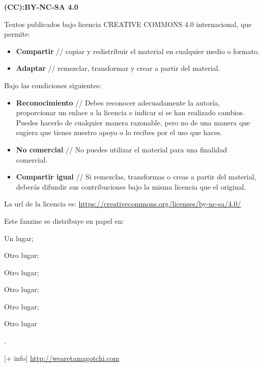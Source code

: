 
\thispagestyle{empty}
\sffamily

\begin{flushleft}\scriptsize
\textbf{(CC):BY-NC-SA 4.0}

\vspace{.5\baselineskip}

Textos publicados bajo licencia CREATIVE COMMONS 4.0 internacional, que permite:

\begin{itemize}
\item \textbf{Compartir} // copiar y redistribuir el material en cualquier medio o formato.
\item \textbf{Adaptar} // remezclar, transformar y crear a partir del material.
\end{itemize}

Bajo las condiciones siguientes:

\begin{itemize}
\item \textbf{Reconocimiento} // Debes reconocer adecuadamente la autoría, proporcionar un enlace a la licencia e indicar si se han realizado cambios. Puedes hacerlo de cualquier manera razonable, pero no de una manera que sugiera que tienes nuestro apoyo o lo recibes por el uso que haces.
\item \textbf{No comercial} // No puedes utilizar el material para una finalidad comercial.
\item \textbf{Compartir igual} // Si remezclas, transformas o creas a partir del material, deberás difundir sus contribuciones bajo la misma licencia que el original.
\end{itemize}

La url de la licencia es: 
\url{https://creativecommons.org/licenses/by-nc-sa/4.0/}

\vspace{1.0\baselineskip}

Este fanzine se distribuye en papel en:
\begin{linelist}
\item Un lugar;
\item Otro lugar;
\item Otro lugar;
\item Otro lugar;
\item Otro lugar;
\item Otro lugar
\end{linelist}.

\end{flushleft}

\vspace*{\fill}

\begin{flushright}\footnotesize
[+ info]\linebreak
\url{http://wearetamagotchi.com}
\end{flushright}

\rmfamily
\clearpage